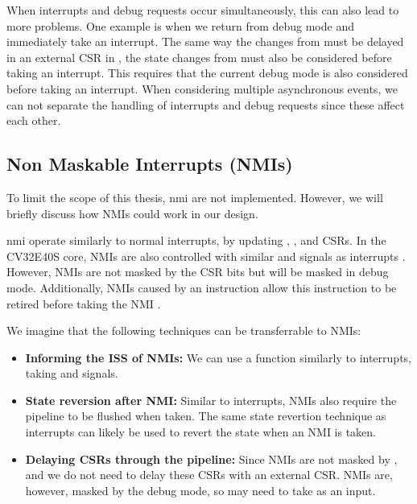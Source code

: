 When interrupts and debug requests occur simultaneously, this can also lead to more problems. One example is when we return from debug mode and immediately take an interrupt.
The same way the changes from  must be delayed in an external CSR in , the state changes from  must also be considered before taking an interrupt. This requires that the current debug mode is also considered before taking an interrupt.
When considering multiple asynchronous events, we can not separate the handling of interrupts and debug requests since these affect each other.

\subsection{Non Maskable Interrupts (NMIs)}

To limit the scope of this thesis, \acrfull{nmi} are not implemented. However, we will briefly discuss how NMIs could work in our design.

\acrfull{nmi} operate similarly to normal interrupts, by updating , , and  CSRs. 
In the CV32E40S core, NMIs are also controlled with similar  and  signals as interrupts \cite{openhwgroupCv32e40s2024}. However, NMIs are not masked by the  CSR bits but will be masked in debug mode. Additionally, NMIs caused by an instruction allow this instruction to be retired before taking the NMI \cite{openhwgroupExceptionsInterruptsCOREV2023}. 

We imagine that the following techniques can be transferrable to NMIs:

\begin{itemize}
    \item \textbf{Informing the ISS of NMIs:} We can use a  function similarly to interrupts, taking  and  signals.
    \item \textbf{State reversion after NMI:} Similar to interrupts, NMIs also require the pipeline to be flushed when taken. The same state revertion technique as interrupts can likely be used to revert the state when an NMI is taken.
    \item \textbf{Delaying CSRs through the pipeline:} Since NMIs are not masked by , and  we do not need to delay these CSRs with an external CSR. NMIs are, however, masked by the debug mode, so  may need to take  as an input. 
\end{itemize}


